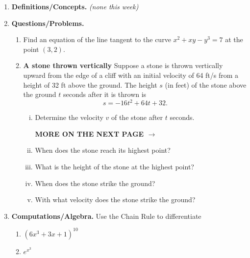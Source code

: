 \documentclass[11pt,letterpaper]{article}
\begin{document}
\begin{enumerate}
\item  \textbf{Definitions/Concepts.} \emph{(none this week)}

\item \textbf{Questions/Problems.} 
	\begin{enumerate}
	\item Find an equation of the line tangent to the curve $x^2+xy-y^3=7$ at the point $(3,2)$.	

	\vspace{15pc}
	\item {\bf A stone thrown vertically}  Suppose a stone is thrown vertically upward from the edge of a cliff with an initial velocity of 64 ft/s from a height of 32 ft above the ground.  The height $s$ (in feet) of the stone above the ground $t$ seconds after it is thrown is 
	\[s=-16t^2+64t+32.\]
		\begin{enumerate}[(i)]
		\item Determine the velocity $v$ of the stone after $t$ seconds.

\vfill
\hfill {\bf\Large MORE ON THE NEXT PAGE $\to$}

\newpage		
		
		\item When does the stone reach its highest point?
		
		\vspace{10pc}
		\item What is the height of the stone at the highest point?
		
		\vspace{5pc}
		\item When does the stone strike the ground?
		
		\vspace{5pc}
		\item With what velocity does the stone strike the ground?
		
		\vspace{5pc}
		\end{enumerate}
	\end{enumerate}	

\vspace{1pc}
\item \textbf{Computations/Algebra.} Use the Chain Rule to differentiate 
	\begin{enumerate}
	\item $(6x^3+3x+1)^{10}$
	
	\vspace{10pc}
	\item $e^{x^3}$
	\end{enumerate}

\end{enumerate}

\end{document}
